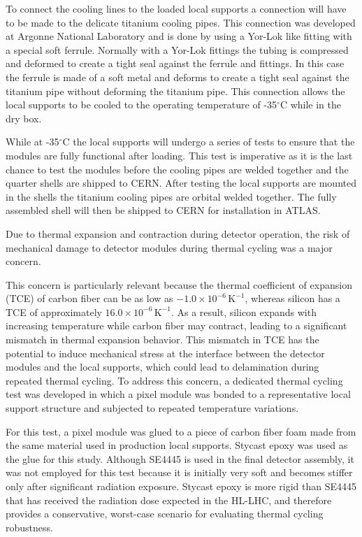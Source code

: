 To connect the cooling lines to the loaded local supports a connection will have to be made to the delicate titanium cooling pipes. 
This connection was developed at Argonne National Laboratory and is done by using a Yor-Lok like fitting with a special soft ferrule.
Normally with a Yor-Lok fittings the tubing is compressed and deformed to create a tight seal against the ferrule and fittings. 
In this case the ferrule is made of a soft metal and deforms to create a tight seal against the titanium pipe without deforming the titanium pipe. 
This connection allows the local supports to be cooled to the operating temperature of -35$^\circ$C while in the dry box.

While at -35$^\circ$C the local supports will undergo a series of tests to ensure that the modules are fully functional after loading.
This test is imperative as it is the last chance to test the modules before the cooling pipes are welded together and the quarter shells are shipped to CERN.
After testing the local supports are mounted in the shells the titanium cooling pipes are orbital welded together. 
The fully assembled shell will then be shipped to CERN for installation in ATLAS. 







Due to thermal expansion and contraction during detector operation, the risk of mechanical damage to detector modules during thermal cycling was a major concern.

This concern is particularly relevant because the thermal coefficient of expansion (TCE) of carbon fiber can be as low as \(-1.0 \times 10^{-6}\,\mathrm{K^{-1}}\), whereas silicon has a TCE of approximately \(16.0 \times 10^{-6}\,\mathrm{K^{-1}}\). 
As a result, silicon expands with increasing temperature while carbon fiber may contract, leading to a significant mismatch in thermal expansion behavior.
This mismatch in TCE has the potential to induce mechanical stress at the interface between the detector modules and the local supports, which could lead to delamination during repeated thermal cycling. 
To address this concern, a dedicated thermal cycling test was developed in which a pixel module was bonded to a representative local support structure and subjected to repeated temperature variations.


For this test, a pixel module was glued to a piece of carbon fiber foam made from the same material used in production local supports. 
Stycast epoxy was used as the glue for this study. 
Although SE4445 is used in the final detector assembly, it was not employed for this test because it is initially very soft and becomes stiffer only after significant radiation exposure. 
Stycast epoxy is more rigid than SE4445 that has received the radiation dose expected in the HL-LHC, and therefore provides a conservative, worst-case scenario for evaluating thermal cycling robustness.


